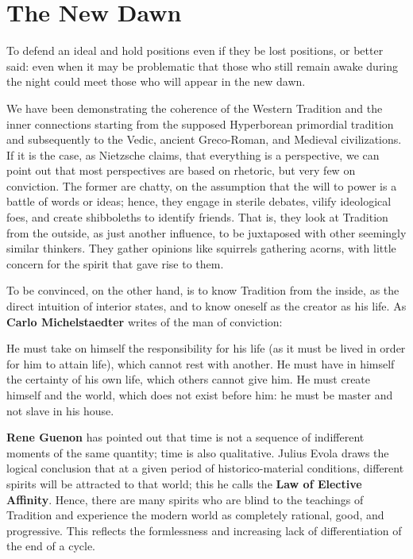 \section{The New Dawn}

\begin{quotex}
To defend an ideal and hold positions even if they be lost positions, or better said: even when it may be problematic that those who still remain awake during the night could meet those who will appear in the new dawn.
\end{quotex}


We have been demonstrating the coherence of the Western Tradition and the inner connections starting from the supposed Hyperborean primordial tradition and subsequently to the Vedic, ancient Greco-Roman, and Medieval civilizations. If it is the case, as Nietzsche claims, that everything is a perspective, we can point out that most perspectives are based on rhetoric, but very few on conviction. The former are chatty, on the assumption that the will to power is a battle of words or ideas; hence, they engage in sterile debates, vilify ideological foes, and create shibboleths to identify friends. That is, they look at Tradition from the outside, as just another influence, to be juxtaposed with other seemingly similar thinkers. They gather opinions like squirrels gathering acorns, with little concern for the spirit that gave rise to them.

To be convinced, on the other hand, is to know Tradition from the inside, as the direct intuition of interior states, and to know oneself as the creator as his life. As \textbf{Carlo Michelstaedter} writes of the man of conviction:

\begin{quotex}
He must take on himself the responsibility for his life (as it must be lived in order for him to attain life), which cannot rest with another. He must have in himself the certainty of his own life, which others cannot give him. He must create himself and the world, which does not exist before him: he must be master and not slave in his house.
\end{quotex}

\textbf{Rene Guenon} has pointed out that time is not a sequence of indifferent moments of the same quantity; time is also qualitative. Julius Evola draws the logical conclusion that at a given period of historico-material conditions, different spirits will be attracted to that world; this he calls the \textbf{Law of Elective Affinity}. Hence, there are many spirits who are blind to the teachings of Tradition and experience the modern world as completely rational, good, and progressive. This reflects the formlessness and increasing lack of differentiation of the end of a cycle.

